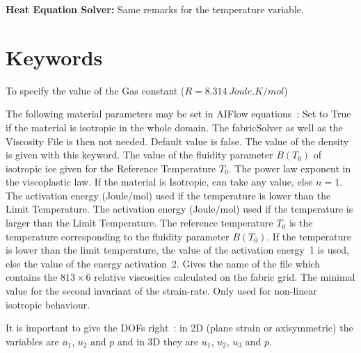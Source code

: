 \noindent \textbf{Heat Equation Solver:} Same remarks for the temperature variable.


 \section{Keywords}

 \sifbegin {} \sifbegin {}
 To specify the value of the Gas constant ($R=8.314\,Joule.K/mol$)
%
 \sifend


 The following material parameters may be set in AIFlow equations~:
%
 \sifbegin
%
%
 Set to True if the material is isotropic in the whole domain. The fabricSolver as well as the Viscosity File is then not needed. Default value is false. 
%
%
 The value of the density is given with this keyword.
%
%
 The value of the fluidity parameter $B(T_0)$ of isotropic ice given for the
 Reference Temperature $T_0$.
%
%
 The power law exponent in the viscoplastic law. If the material is Isotropic, can take any value, else $n=1$.
%
%
 The activation energy (Joule/mol) used if the temperature is lower than the Limit
 Temperature.
%
%
 The activation energy (Joule/mol) used if the temperature is larger than the Limit
 Temperature.
%
%
 The reference temperature $T_0$ is the temperature corresponding to the  fluidity
 parameter $B(T_0)$.
%
%
 If the temperature is lower than the limit temperature, the value of the activation
 energy~1 is used, else the value of the energy activation~2.
%
%
 Gives the name of the file which contains the $813 \times 6$ relative viscosities
 calculated on the fabric grid.
%
%
%
 The minimal value for the second invariant of the strain-rate. Only used for non-linear isotropic behaviour.
 \sifend



\sifbegin
%


%
It is important to give the DOFs right~: in 2D (plane strain or axisymmetric) the variables are  $u_1$, $u_2$ and $p$
and in 3D they are $u_1$, $u_2$, $u_3$ and $p$.



